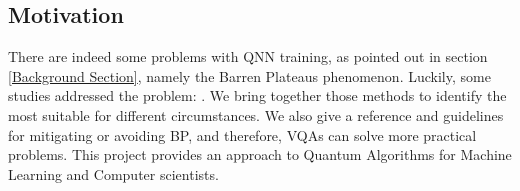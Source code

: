 \subsection{Motivation}
There are indeed some problems with QNN training, as pointed out in section \ref{Background Section}, namely the Barren Plateaus phenomenon.
Luckily, some studies addressed the problem: \cite{pesahAbsenceBarrenPlateaus2021,pattiEntanglementDevisedBarren2021,liuParameterInitializationMethod2021}.
We bring together those methods to identify the most suitable for different circumstances.
We also give a reference and guidelines for mitigating or avoiding BP, and therefore, VQAs can solve more practical problems. 
This project provides an approach to Quantum Algorithms for Machine Learning and Computer scientists.